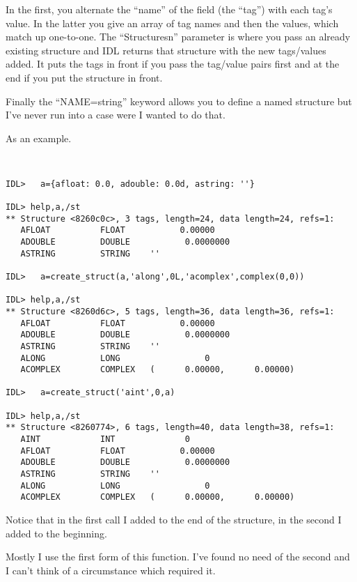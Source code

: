 In the first, you alternate the ``name'' of the field (the ``tag'')
with each tag's value. In the latter you give an array of tag names and
then the values, which match up one-to-one. The ``Structuresn''
parameter is where you pass an already existing structure and IDL
returns that structure with the new tags/values added. It puts the
tags in front if you pass the tag/value pairs first and at the end if
you put the structure in front.

Finally the ``NAME=string'' keyword allows you to define a named
structure but I've never run into a case were I wanted to do that.


As an example.

\begin{IDLExample}\begin{verbatim}


IDL>   a={afloat: 0.0, adouble: 0.0d, astring: ''}

IDL> help,a,/st
** Structure <8260c0c>, 3 tags, length=24, data length=24, refs=1:
   AFLOAT          FLOAT           0.00000
   ADOUBLE         DOUBLE           0.0000000
   ASTRING         STRING    ''

IDL>   a=create_struct(a,'along',0L,'acomplex',complex(0,0))

IDL> help,a,/st
** Structure <8260d6c>, 5 tags, length=36, data length=36, refs=1:
   AFLOAT          FLOAT           0.00000
   ADOUBLE         DOUBLE           0.0000000
   ASTRING         STRING    ''
   ALONG           LONG                 0
   ACOMPLEX        COMPLEX   (      0.00000,      0.00000)

IDL>   a=create_struct('aint',0,a)

IDL> help,a,/st
** Structure <8260774>, 6 tags, length=40, data length=38, refs=1:
   AINT            INT              0
   AFLOAT          FLOAT           0.00000
   ADOUBLE         DOUBLE           0.0000000
   ASTRING         STRING    ''
   ALONG           LONG                 0
   ACOMPLEX        COMPLEX   (      0.00000,      0.00000)

\end{verbatim}\end{IDLExample}
    
    Notice that in the first call I added to the end of the structure,
    in the second I added to the beginning.

Mostly I use the first form of this function. I've found no need of
the second and I can't think of a circumstance which required it.



